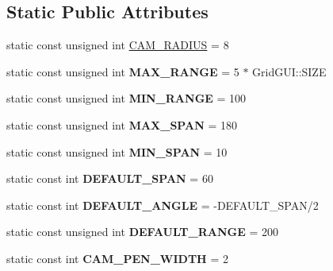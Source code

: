 \subsection*{Static Public Attributes}
\begin{DoxyCompactItemize}
\item 
static const unsigned int \hyperlink{classCameraGUI_a3bfd5efeeb6e8474ff4d1106440ca1ab}{C\-A\-M\-\_\-\-R\-A\-D\-I\-U\-S} = 8
\item 
\hypertarget{classCameraGUI_a7f8ecb7208f8d6256f5eeb18db936244}{static const unsigned int {\bfseries M\-A\-X\-\_\-\-R\-A\-N\-G\-E} = 5 $\ast$ Grid\-G\-U\-I\-::\-S\-I\-Z\-E}\label{classCameraGUI_a7f8ecb7208f8d6256f5eeb18db936244}

\item 
\hypertarget{classCameraGUI_adc4a994ad297cfff1e76c1e00bced733}{static const unsigned int {\bfseries M\-I\-N\-\_\-\-R\-A\-N\-G\-E} = 100}\label{classCameraGUI_adc4a994ad297cfff1e76c1e00bced733}

\item 
\hypertarget{classCameraGUI_a0bab41ff4cf14b5b7e3256a780792fd1}{static const unsigned int {\bfseries M\-A\-X\-\_\-\-S\-P\-A\-N} = 180}\label{classCameraGUI_a0bab41ff4cf14b5b7e3256a780792fd1}

\item 
\hypertarget{classCameraGUI_ab92e05091879d7af4c710be042bea717}{static const unsigned int {\bfseries M\-I\-N\-\_\-\-S\-P\-A\-N} = 10}\label{classCameraGUI_ab92e05091879d7af4c710be042bea717}

\item 
\hypertarget{classCameraGUI_a4757b83877c8a4dcc70d1025df24fb9f}{static const int {\bfseries D\-E\-F\-A\-U\-L\-T\-\_\-\-S\-P\-A\-N} = 60}\label{classCameraGUI_a4757b83877c8a4dcc70d1025df24fb9f}

\item 
\hypertarget{classCameraGUI_a9562f728089b5066cb0fd5e09b64dcaa}{static const int {\bfseries D\-E\-F\-A\-U\-L\-T\-\_\-\-A\-N\-G\-L\-E} = -\/D\-E\-F\-A\-U\-L\-T\-\_\-\-S\-P\-A\-N/2}\label{classCameraGUI_a9562f728089b5066cb0fd5e09b64dcaa}

\item 
\hypertarget{classCameraGUI_a1870cb9bfe4d69423954af5153b5e6dc}{static const unsigned int {\bfseries D\-E\-F\-A\-U\-L\-T\-\_\-\-R\-A\-N\-G\-E} = 200}\label{classCameraGUI_a1870cb9bfe4d69423954af5153b5e6dc}

\item 
\hypertarget{classCameraGUI_ad29d1cc52182c76904726d279082a4eb}{static const int {\bfseries C\-A\-M\-\_\-\-P\-E\-N\-\_\-\-W\-I\-D\-T\-H} = 2}\label{classCameraGUI_ad29d1cc52182c76904726d279082a4eb}


\end{DoxyCompactItemize}
